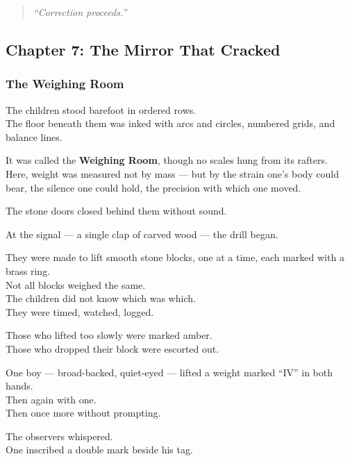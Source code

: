 \documentclass[12pt]{article}
\begin{document}
\begin{quote}
\textit{“Correction proceeds.”}
\end{quote}

\newpage

\subsection{Chapter 7: The Mirror That Cracked}

\vspace{.5in}

\subsubsection{The Weighing Room}

The children stood barefoot in ordered rows.\\
The floor beneath them was inked with arcs and circles, numbered grids, and balance lines.

It was called the \textbf{Weighing Room}, though no scales hung from its rafters.\\
Here, weight was measured not by mass — but by the strain one’s body could bear, the silence one could hold, the precision with which one moved.

The stone doors closed behind them without sound.

\vspace{1em}

At the signal — a single clap of carved wood — the drill began.

They were made to lift smooth stone blocks, one at a time, each marked with a brass ring.\\
Not all blocks weighed the same.\\
The children did not know which was which.\\
They were timed, watched, logged.

Those who lifted too slowly were marked amber.\\
Those who dropped their block were escorted out.

\vspace{1em}

One boy — broad-backed, quiet-eyed — lifted a weight marked “IV” in both hands.\\
Then again with one.\\
Then once more without prompting.

The observers whispered.\\
One inscribed a double mark beside his tag.
\end{document}
